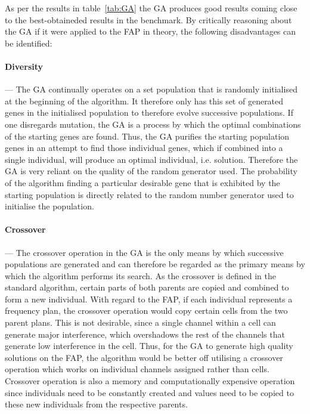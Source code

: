 As per the results in table~\ref{tab:GA} the \gls{GA} produces good results coming close to the best-obtaineded results in the benchmark. By critically reasoning about the \gls{GA} if it were applied to the \gls{FAP} in theory, the following disadvantages can be identified:

\paragraph{Diversity}
--- The \gls{GA} continually operates on a set population that is randomly initialised at the beginning of the algorithm. It therefore only has this set of generated genes in the initialised population to therefore evolve successive populations.
If one disregards mutation, the \gls{GA} is a process by which the optimal combinations of the starting genes are found. Thus, the \gls{GA} purifies the starting population genes in an attempt to find those individual genes, which if combined into a single individual, will produce an optimal individual, i.e. solution. Therefore the \gls{GA} is very reliant on the quality of the random generator used. The probability of the algorithm finding a particular desirable gene that is exhibited by the starting population is directly related to the random number generator used to initialise the population. 
\paragraph{Crossover}
--- The crossover operation in the \gls{GA} is the only means by which successive populations are generated and can therefore be regarded as the primary means by which the algorithm performs its search. As the crossover is defined in the standard algorithm, certain parts of both parents are copied and combined to form a new individual. With regard to the \gls{FAP}, if each individual represents a frequency plan, the crossover operation would copy certain cells from the two parent plans. This is not desirable, since a single channel within a cell can generate major interference, which overshadows the rest of the channels that generate low interference in the cell. Thus, for the \gls{GA} to generate high quality solutions on the \gls{FAP}, the algorithm would be better off utilising a crossover operation which works on individual channels assigned rather than cells. Crossover operation is also a memory and computationally expensive operation since individuals need to be constantly created and values need to be copied to these new individuals from the respective parents.
